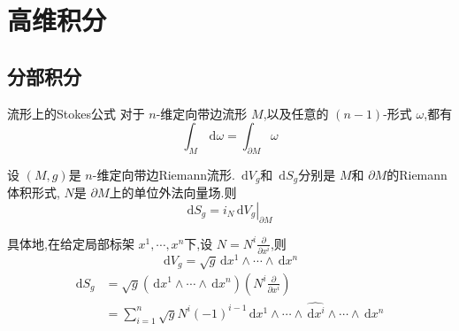 \documentclass[../../main.tex]{subfiles}
\begin{document}
\chapter{ 高维积分 }
\section{分部积分}
\begin{theorem}{流形上的Stokes公式}
    对于 \(  n  \)-维定向带边流形 \(  M  \),以及任意的 \(  \left( n-1 \right)   \)-形式 \(   \omega   \),都有 \[
    \int_{M}\,\mathrm{d}  \omega = \int_{ \partial M} \omega 
    \]   
\end{theorem}

\begin{lemma}
    设 \(  \left( M,g \right)   \)是 \(  n  \)-维定向带边Riemann流形. \(   \,\mathrm{d} V_{g}\)和 \(   \,\mathrm{d} S_{g} \)分别是 \(  M  \)和 \(   \partial M  \)的Riemann体积形式, \(  N  \)是 \(   \partial M  \)上的单位外法向量场.则 \[
    \mathrm{d} S_{g}=  \left. i_{N}  \,\mathrm{d} V_{g}\right|_{ \partial M}
    \] 

    具体地,在给定局部标架 \(   x^1,\cdots,x^n   \)下,设 \(  N= N^{i}\frac{\partial }{\partial x^{i}}  \),则 \[
     \,\mathrm{d} V_{g}= \sqrt{g}\,\mathrm{d} x^{1}\wedge \cdots \wedge \,\mathrm{d} x^{n}
    \]   \[
   \begin{aligned}
   \mathrm{d} S_{g}&= \sqrt{g}\left( \,\mathrm{d} x^{1}\wedge \cdots \wedge \,\mathrm{d} x^{n} \right)\left( N^{i}\frac{\partial }{\partial x^{i}} \right)\\ 
     & = \sum _{i= 1}^{n}\sqrt{g}N^{i}\left( -1 \right)^{i-1} \,\mathrm{d} x^{1}\wedge \cdots \wedge \widehat{\,\mathrm{d} x^{i}}\wedge \cdots \wedge \,\mathrm{d} x^{n}   
   \end{aligned}
    \]
\end{lemma}
\end{document}
